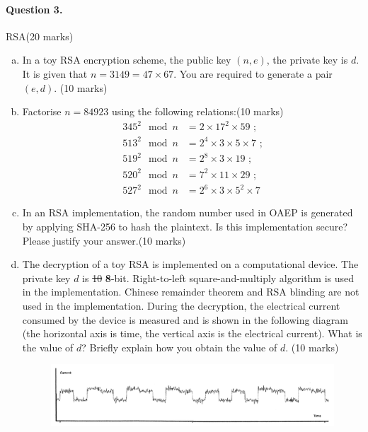 \documentclass[12pt]{article}
\begin{document}
\paragraph{Question 3.}   RSA\hfill (20 marks)
\begin{enumerate}[(a)]
\item In a toy RSA encryption scheme, the public key $(n,e)$, the private key is $d$. It is given that $n=3149=47\times 67$. You are required to generate a pair $(e,d)$. \hfill (10 marks)
\item Factorise $n=84923$ using the following relations:\hfill (10 marks)\\
\begin{equation*}
\begin{split}
345^2\mod n&=2\times 17^2\times 59\text{ ;}\\
513^2\mod n&=2^4\times 3\times 5\times 7\text{ ;}\\
519^2\mod n&=2^8\times 3\times 19\text{ ;}\\
520^2\mod n&=7^2\times 11\times 29\text{ ;}\\
527^2\mod n&=2^6\times 3\times 5^2\times 7
\end{split}
\end{equation*}
\item In an RSA implementation, the random number used in OAEP is generated by applying SHA-256 to hash the plaintext. Is this implementation secure? Please justify your answer.\hfill (10 marks)
\item The decryption of a toy RSA is implemented on a computational device. The private key $d$ is \st{10} \textbf{8}-bit. Right-to-left square-and-multiply algorithm is used in the implementation. Chinese remainder theorem and RSA blinding are not used in the implementation. During the decryption, the electrical current consumed by the device is measured and is shown in the following diagram (the horizontal axis is time, the vertical axis is the electrical current). What is the value of $d$? Briefly explain how you obtain the value of $d$. \hfill (10 marks)
\begin{figure}[H]
\centering
\includegraphics[width=1\linewidth]{Capture}
\label{fig:capture}
\end{figure}
\end{enumerate}
\end{document}
